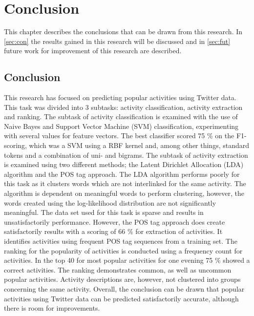 \chapter{Conclusion} %
\label{ch:cncl} %
This chapter describes the conclusions that can be drawn from this research. In \autoref{sec:con} the results gained in this research will be discussed and in \autoref{sec:fut} future work for improvement of this research are described.
\section{Conclusion}\label{sec:con}
This research has focused on predicting popular activities using Twitter data. This task was divided into 3 subtasks: activity classification, activity extraction and ranking. The subtask of activity classification is examined with the use of Naive Bayes and Support Vector Machine (SVM) classification, experimenting with several values for feature vectors. The best classifier scored 75 \% on the F1-scoring, which was a SVM using a RBF kernel and, among other things, standard tokens and a combination of uni- and bigrams.
The subtask of activity extraction is examined using two different methods; the Latent Dirichlet Allocation (LDA) algorithm and the POS tag approach. The LDA algorithm performs poorly for this task as it clusters words which are not interlinked for the same activity. The algorithm is dependent on meaningful words to perform clustering, however, the words created using the log-likelihood distribution are not significantly meaningful. The data set used for this task is sparse and results in unsatisfactorily performance.
However, the POS tag approach does create satisfactorily results with a scoring of 66 \% for extraction of activities. It identifies activities using frequent POS tag sequences from a training set. 
The ranking for the popularity of activities is conducted using a frequency count for activities. In the top 40 for most popular activities for one evening 75 \% showed a correct activities. The ranking demonstrates common, as well as uncommon popular activities. Activity descriptions are, however, not clustered into groups concerning the same activity.
Overall, the conclusion can be drawn that popular activities using Twitter data can be predicted satisfactorily accurate, although there is room for improvements. 
